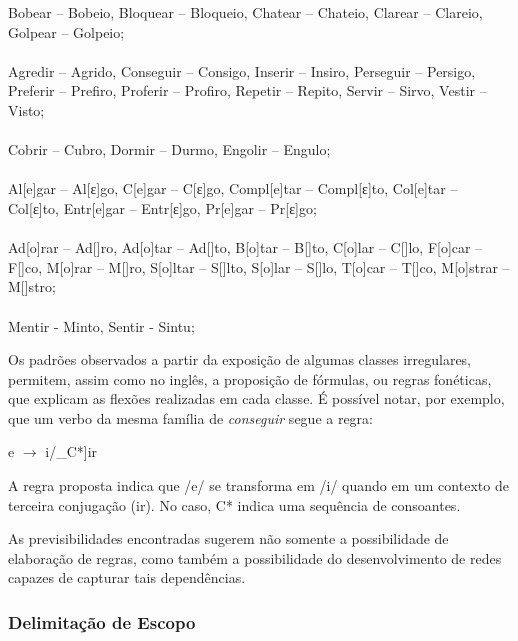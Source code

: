 \begin{center}

Bobear – Bobeio, Bloquear – Bloqueio, Chatear – Chateio, Clarear – Clareio, Golpear – Golpeio;\\
\\
Agredir – Agrido, Conseguir – Consigo, Inserir – Insiro, Perseguir – Persigo, Preferir – Prefiro, Proferir – Profiro, Repetir – Repito, Servir –  Sirvo, Vestir – Visto;\\
\\
Cobrir – Cubro, Dormir – Durmo, Engolir – Engulo;\\
\\
 Al[e]gar – Al[ε]go, C[e]gar – C[ε]go, Compl[e]tar – Compl[ε]to,  Col[e]tar – Col[ε]to, Entr[e]gar – Entr[ε]go, Pr[e]gar – Pr[ε]go;\\
\\
Ad[o]rar – Ad[\textopeno]ro, Ad[o]tar – Ad[\textopeno]to, B[o]tar – B[\textopeno]to, C[o]lar – C[\textopeno]lo, F[o]car – F[\textopeno]co, M[o]rar – M[\textopeno]ro, S[o]ltar – S[\textopeno]lto, S[o]lar – S[\textopeno]lo, T[o]car – T[\textopeno]co, M[o]strar – M[\textopeno]stro;\\
\\
Mentir - Minto, Sentir - Sintu;

\end{center}



Os padrões observados a partir da exposição de algumas classes irregulares, permitem, assim como no inglês, a proposição de fórmulas, ou regras fonéticas, que explicam as flexões realizadas em cada classe. É possível notar, por exemplo, que um verbo da mesma família de \textit{conseguir} segue a regra:

\begin{center}
e $\rightarrow$ i/\_C*]ir 
\end{center}

A regra proposta indica que /e/ se transforma em /i/ quando em um contexto de terceira conjugação (ir). No caso, C* indica uma sequência de consoantes. 

As previsibilidades encontradas sugerem não somente a possibilidade de elaboração de regras, como também a possibilidade do desenvolvimento de redes capazes de capturar tais dependências. 

\subsubsection{Delimitação de Escopo}


